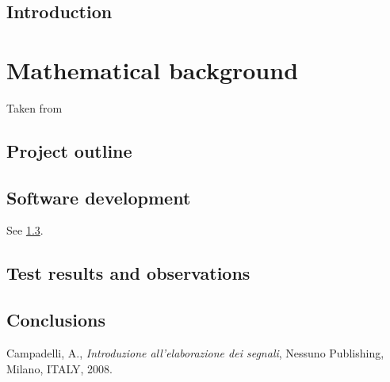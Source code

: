 \documentclass[a4paper,11pt,twoside,openright]{book}
\begin{document}
\tableofcontents
\section*{Introduction}
\label{intro}
\chapter{Mathematical background}
\label{math_bkg}
Taken from \cite{campade}
\section{Project outline}
\label{outline}
\section{Software development}
\label{sw_devel}
See \ref{tests}.
\section{Test results and observations}
\label{tests}
\section{Conclusions}
\label{conclusions}
\begin{thebibliography}{99}
 Campadelli, A., \emph{Introduzione all'elaborazione dei segnali}, Nessuno Publishing, Milano, ITALY, 2008.
\end{thebibliography}
\end{document}
